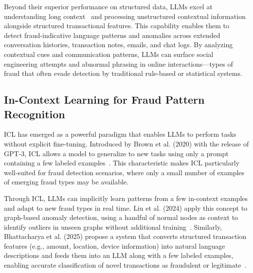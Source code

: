 \documentclass[sigconf]{acmart}
\begin{document}
Beyond their superior performance on structured data, LLMs excel at understanding long context~\cite{bertsch2025,chen2024longcontext} and processing unstructured contextual information alongside structured transactional features. This capability enables them to detect fraud-indicative language patterns and anomalies across extended conversation histories, transaction notes, emails, and chat logs. By analyzing contextual cues and communication patterns, LLMs can surface social engineering attempts and abnormal phrasing in online interactions—types of fraud that often evade detection by traditional rule-based or statistical systems.



\subsection{In-Context Learning for Fraud Pattern Recognition}
ICL has emerged as a powerful paradigm that enables LLMs to perform tasks without explicit fine-tuning. Introduced by Brown et al. (2020) with the release of GPT-3, ICL allows a model to generalize to new tasks using only a prompt containing a few labeled examples~\cite{brown2020llm_fewshot}. This characteristic makes ICL particularly well-suited for fraud detection scenarios, where only a small number of examples of emerging fraud types may be available.

Through ICL, LLMs can implicitly learn patterns from a few in-context examples and adapt to new fraud types in real time. Liu et al. (2024) apply this concept to graph-based anomaly detection, using a handful of normal nodes as context to identify outliers in unseen graphs without additional training~\cite{liu2024anomaly}. Similarly, Bhattacharya et al. (2025) propose a system that converts structured transaction features (e.g., amount, location, device information) into natural language descriptions and feeds them into an LLM along with a few labeled examples, enabling accurate classification of novel transactions as fraudulent or legitimate~\cite{bhattacharya2024fraud}.
\end{document}
